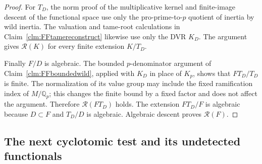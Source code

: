 \begin{proof}
For \(T_D\), the norm proof of the multiplicative
kernel and finite-image descent of the functional
space use only the pro-prime-to-\(p\) quotient
of inertia by wild inertia. The valuation and
tame-root calculations in
Claim~\ref{clm:FFtamereconstruct} likewise use
only the DVR \(K_D\). The argument gives
\(\mathcal R(K)\) for every finite extension
\(K/T_D\).

Finally \(F/D\) is algebraic. The bounded
\(p\)-denominator argument of
Claim~\ref{clm:FFboundedwild}, applied with
\(K_D\) in place of \(K_p\), shows that
\(FT_D/T_D\) is finite. The normalization of
its value group may include the fixed
ramification index of \(M/\mathbb Q_p\);
this changes the finite bound by a fixed factor
and does not affect the argument. Therefore
\(\mathcal R(FT_D)\) holds. The extension
\(FT_D/F\) is algebraic because \(D\subset F\)
and \(T_D/D\) is algebraic. Algebraic descent
proves \(\mathcal R(F)\).
\end{proof}

\subsection{The next cyclotomic test and its undetected functionals}

